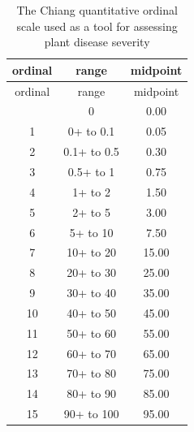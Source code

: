 \documentclass[
  letterpaper,
  DIV=11,
  numbers=noendperiod]{scrreprt}
\begin{document}
\hypertarget{tbl-chiang}{}
\begin{longtable}[]{@{}ccc@{}}
\caption{\label{tbl-chiang}The Chiang quantitative ordinal scale used as
a tool for assessing plant disease severity}\tabularnewline
\toprule\noalign{}
ordinal & range & midpoint \\
\midrule\noalign{}
\endfirsthead
\toprule\noalign{}
ordinal & range & midpoint \\
\midrule\noalign{}
\endhead
\bottomrule\noalign{}
\endlastfoot
0 & 0 & 0.00 \\
1 & 0+ to 0.1 & 0.05 \\
2 & 0.1+ to 0.5 & 0.30 \\
3 & 0.5+ to 1 & 0.75 \\
4 & 1+ to 2 & 1.50 \\
5 & 2+ to 5 & 3.00 \\
6 & 5+ to 10 & 7.50 \\
7 & 10+ to 20 & 15.00 \\
8 & 20+ to 30 & 25.00 \\
9 & 30+ to 40 & 35.00 \\
10 & 40+ to 50 & 45.00 \\
11 & 50+ to 60 & 55.00 \\
12 & 60+ to 70 & 65.00 \\
13 & 70+ to 80 & 75.00 \\
14 & 80+ to 90 & 85.00 \\
15 & 90+ to 100 & 95.00 \\
\end{longtable}
\end{document}

